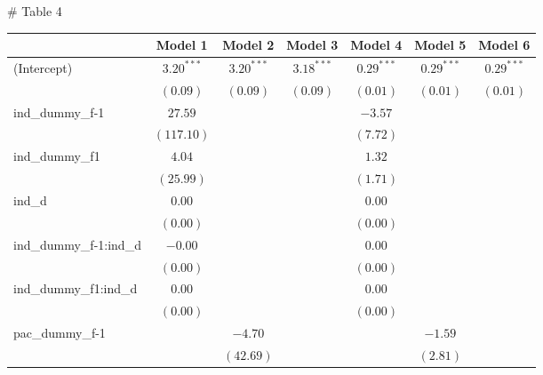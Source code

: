 \documentclass{article}
\begin{document}


# Table 4
\begin{table}
\begin{center}
\begin{tabular}{l c c c c c c }
\hline
 & Model 1 & Model 2 & Model 3 & Model 4 & Model 5 & Model 6 \\
\hline
(Intercept)                   & $3.20^{***}$ & $3.20^{***}$ & $3.18^{***}$ & $0.29^{***}$ & $0.29^{***}$ & $0.29^{***}$ \\
                              & $(0.09)$     & $(0.09)$     & $(0.09)$     & $(0.01)$     & $(0.01)$     & $(0.01)$     \\
ind\_dummy\_f-1               & $27.59$      &              &              & $-3.57$      &              &              \\
                              & $(117.10)$   &              &              & $(7.72)$     &              &              \\
ind\_dummy\_f1                & $4.04$       &              &              & $1.32$       &              &              \\
                              & $(25.99)$    &              &              & $(1.71)$     &              &              \\
ind\_d                        & $0.00$       &              &              & $0.00$       &              &              \\
                              & $(0.00)$     &              &              & $(0.00)$     &              &              \\
ind\_dummy\_f-1:ind\_d        & $-0.00$      &              &              & $0.00$       &              &              \\
                              & $(0.00)$     &              &              & $(0.00)$     &              &              \\
ind\_dummy\_f1:ind\_d         & $0.00$       &              &              & $0.00$       &              &              \\
                              & $(0.00)$     &              &              & $(0.00)$     &              &              \\
pac\_dummy\_f-1               &              & $-4.70$      &              &              & $-1.59$      &              \\
                              &              & $(42.69)$    &              &              & $(2.81)$     &              \\

\end{tabular}
\end{center}
\end{table}
\end{document}
